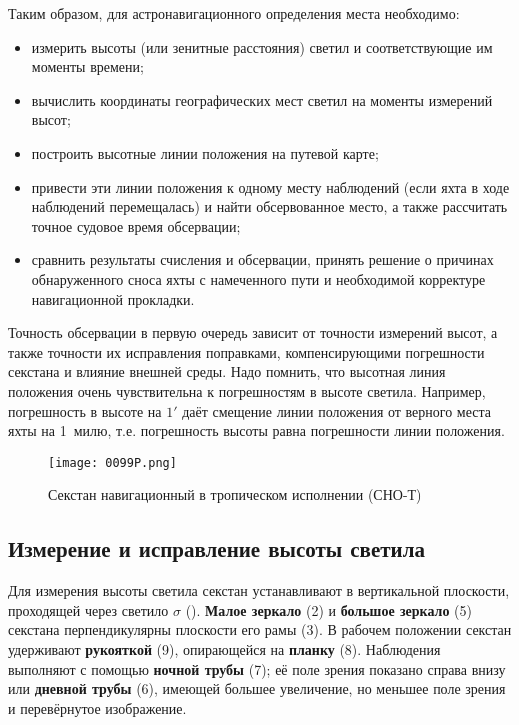 Таким образом, для астронавигационного определения места необходимо:

\begin{itemize}
\item измерить высоты (или зенитные расстояния) светил и
  соответствующие им моменты времени;
\item вычислить координаты географических мест светил на моменты
  измерений высот;
\item построить высотные линии положения на путевой карте;
\item привести эти линии положения к одному месту наблюдений (если
  яхта в ходе наблюдений перемещалась) и найти обсервованное место, а
  также рассчитать точное судовое время обсервации;
\item сравнить результаты счисления и обсервации, принять решение о
  причинах обнаруженного сноса яхты с намеченного пути и необходимой
  корректуре навигационной прокладки.
\end{itemize}

Точность обсервации в первую очередь зависит от точности измерений
высот, а также точности их исправления поправками, компенсирующими
погрешности секстана и влияние внешней среды. Надо помнить, что
высотная линия положения очень чувствительна к погрешностям в высоте
светила. Например, погрешность в высоте на $1'$ даёт смещение линии
положения от верного места яхты на 1~милю, т.е. погрешность высоты
равна погрешности линии положения.

\begin{figure*}[!htb]
  \centering
  \texttt{[image: 0099P.png]}
  \caption{Секстан навигационный в тропическом исполнении (СНО-Т)}
  \label{fig:99}
\end{figure*}

\subsection{Измерение и исправление высоты светила}

Для измерения высоты светила секстан устанавливают в вертикальной
плоскости, проходящей через светило $\sigma$
(). \textbf{Малое зеркало} (2) и \textbf{большое зеркало} (5)
секстана перпендикулярны плоскости его рамы (3). В рабочем положении
секстан удерживают \textbf{рукояткой} (9), опирающейся на
\textbf{планку} (8). Наблюдения выполняют с помощью \textbf{ночной
  трубы} (7); её поле зрения показано справа внизу или \textbf{дневной
  трубы} (6), имеющей большее увеличение, но меньшее поле зрения и
перевёрнутое изображение.

